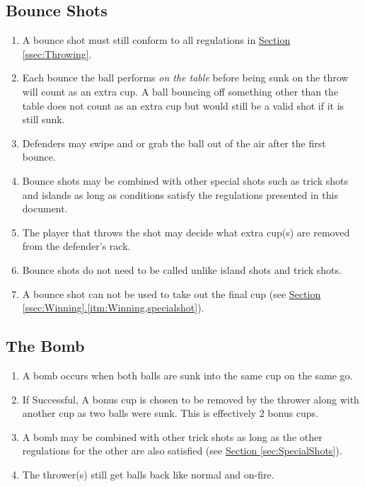 	\subsection{Bounce Shots}\label{ssec:BounceShots}
		\begin{enumerate}[label=(\roman*), ref=\roman*]
            \item \label{itm:BounceShots,rules} A bounce shot must still conform to all regulations in \hyperref[ssec:Throwing]{Section \ref*{ssec:Throwing}}.
            \item \label{itm:BounceShots,multibounce} Each bounce the ball performs \textit{on the table} before being sunk on the throw will count as an extra cup.
                A ball bouncing off something other than the table does not count as an extra cup but would still be a valid shot if it is still sunk.
            \item \label{itm:BounceShots,swipegrab} Defenders may swipe and or grab the ball out of the air after the first bounce.
            \item \label{itm:BounceShots,combo} Bounce shots may be combined with other special shots such as trick shots and islands as long as conditions satisfy the regulations presented in this document.
            \item \label{itm:BounceShots,removedcups} The player that throws the shot may decide what extra cup(s) are removed from the defender's rack.
            \item \label{itm:BounceShots,calling} Bounce shots do not need to be called unlike island shots and trick shots.
            \item \label{itm:BounceShots,winning} A bounce shot can not be used to take out the final cup
                (see \hyperref[itm:Winning,specialshot]{Section \ref*{ssec:Winning}.\ref*{itm:Winning,specialshot}}).
    \end{enumerate}
	\subsection{The Bomb}\label{ssec:Bomb}
        \begin{enumerate}[label=(\roman*), ref=\roman*]
            \item \label{itm:Bomb,condition} A bomb occurs when both balls are sunk into the same cup on the same go. 
            \item \label{itm:Bomb,success} If Successful, A bonus cup is chosen to be removed by the thrower along with another cup as two balls were sunk.
                This is effectively 2 bonus cups.
            \item \label{itm:Bomb,combo} A bomb may be combined with other trick shots as long as the other regulations for the other are also satisfied
                (see \hyperref[sec:SpecialShots]{Section \ref*{sec:SpecialShots}}).
            \item \label{itm:Bomb,ballback} The thrower(s) still get balls back like normal and on-fire.
        \end{enumerate}
